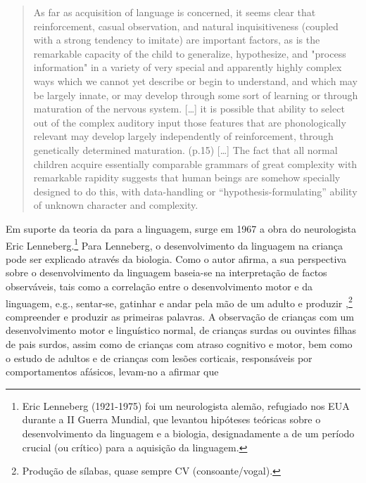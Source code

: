 \documentclass[output=paper]{LSP/langsci}
\begin{document}
\begin{quote}
As far as acquisition of language is concerned, it seems clear that reinforcement, casual observation, and natural inquisitiveness (coupled with a strong tendency to imitate) are important factors, as is the remarkable capacity of the child to generalize, hypothesize, and "process information" in a variety of very special and apparently highly complex ways which we cannot yet describe or begin to understand, and which may be largely innate, or may develop through some sort of learning or through maturation of the nervous system. [\ldots] it is possible that ability to select out of the complex auditory input those features that are phonologically relevant may develop largely independently of reinforcement, through genetically determined maturation. (p.15) [\ldots] The fact that all normal children acquire essentially comparable grammars of great complexity with remarkable rapidity suggests that human beings are somehow specially designed to do this, with data-handling or ``hypothesis-formulating'' ability of unknown character and complexity. \citep[50]{chomsky1959}
\end{quote}\newpage

Em suporte da teoria da  para a linguagem, surge em 1967 a obra  do neurologista Eric Lenneberg.\footnote{Eric Lenneberg (1921-1975) foi um neurologista alemão, refugiado nos EUA durante a II Guerra Mundial, que levantou hipóteses teóricas sobre o desenvolvimento da linguagem e a biologia, designadamente a de um período crucial (ou crítico) para a aquisição da linguagem.} Para Lenneberg, o desenvolvimento da linguagem na criança pode ser explicado através da biologia. Como o autor afirma, a sua perspectiva sobre o desenvolvimento da linguagem baseia-se na interpretação de factos observáveis, tais como a correlação entre o desenvolvimento motor e  da linguagem, e.g., sentar-se, gatinhar e andar pela mão de um adulto e produzir ,\footnote{Produção de sílabas, quase sempre CV (consoante/vogal).} compreender e produzir as primeiras palavras. A observação de crianças com um desenvolvimento motor e linguístico normal, de crianças surdas ou ouvintes filhas de pais surdos, assim como de crianças com atraso cognitivo e motor, bem como o estudo de adultos e de crianças com lesões corticais, responsáveis por comportamentos afásicos, levam-no a afirmar que
\end{document}
